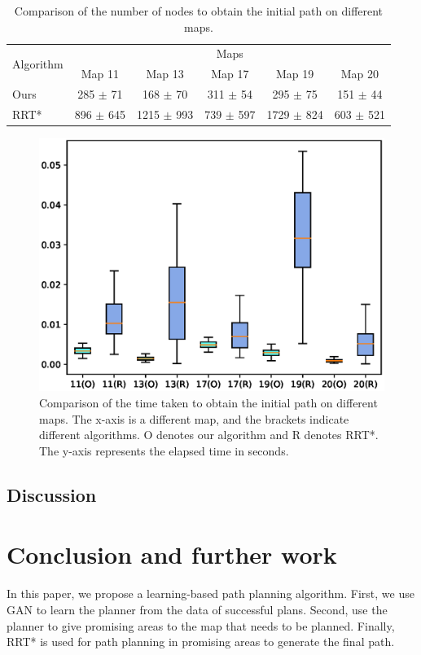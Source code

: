 \documentclass[smallcondensed]{svjour3}     %
\begin{document}
\begin{table}[ht]
	\centering
	\begin{tabular}{l|c|c|c|c|c}
	\toprule
	\multirow{2}{*}{Algorithm} & \multicolumn{5}{c}{Maps} \\
	\cline{2-6}
	& Map 11 & Map 13 & Map 17 & Map 19 & Map 20 \\
	\midrule
	Ours & 285 $\pm$ 71 & 168 $\pm$ 70 & 311 $\pm$ 54 & 295 $\pm$ 75 & 151 $\pm$ 44 \\
	\midrule
	RRT* & 896 $\pm$ 645 & 1215 $\pm$ 993 & 739 $\pm$ 597 & 1729 $\pm$ 824 & 603 $\pm$ 521 \\
	\bottomrule
	\end{tabular}
	\caption{Comparison of the number of nodes to obtain the initial path on different maps.}
	\label{tab: nodes}
\end{table}

\begin{figure}
	\centering
	\includegraphics[width=1\linewidth]{first_time.eps}
	\caption{Comparison of the time taken to obtain the initial path on different maps.
	The x-axis is a different map, and the brackets indicate different algorithms.
	O denotes our algorithm and R denotes RRT*.
	The y-axis represents the elapsed time in seconds.}
	\label{fig: time}
\end{figure}


\subsection{Discussion}


\section{Conclusion and further work}\label{section: conclusions}
In this paper, we propose a learning-based path planning algorithm.
First, we use GAN to learn the planner from the data of successful plans.
Second, use the planner to give promising areas to the map that needs to be planned.
Finally, RRT* is used for path planning in promising areas to generate the final path.
\end{document}
